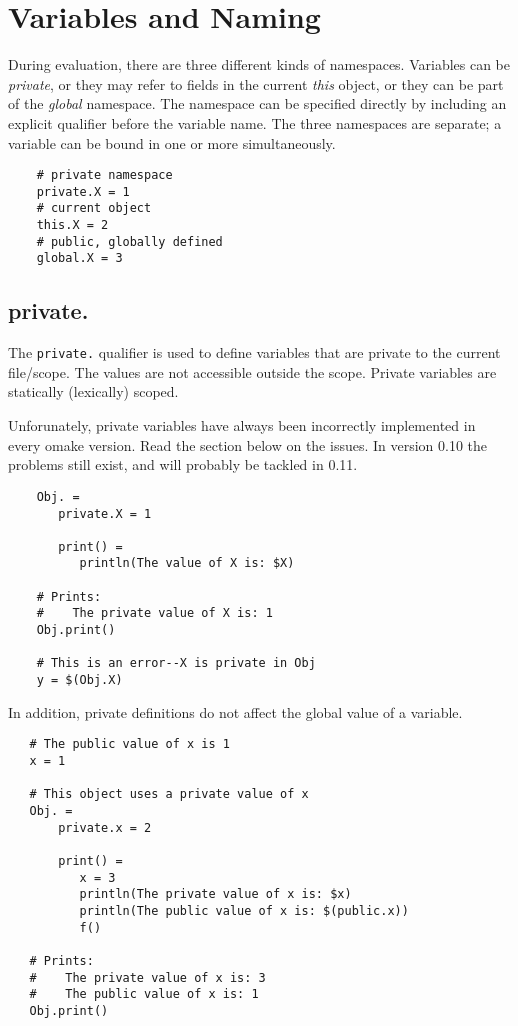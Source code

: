 %
\chapter{Variables and Naming}
\label{chapter:naming}

During evaluation, there are three different kinds of namespaces.  Variables can be \emph{private},
or they may refer to fields in the current \emph{this} object, or they can be part of the
\emph{global} namespace.  The namespace can be specified directly by including an explicit qualifier
before the variable name.  The three namespaces are separate; a variable can be bound in one or more
simultaneously.

\begin{verbatim}
    # private namespace
    private.X = 1
    # current object
    this.X = 2
    # public, globally defined
    global.X = 3
\end{verbatim}

\section{private.}
\label{section:private}

The \verb+private.+ qualifier is used to define variables that are private to the current file/scope.
The values are not accessible outside the scope.  Private variables are statically (lexically) scoped.

\begin{bf}
Unforunately, private variables have always been incorrectly implemented
in every omake version. Read the section below on the issues. In version
0.10 the problems still exist, and will probably be tackled in 0.11.
\end{bf}

\begin{verbatim}
    Obj. =
       private.X = 1

       print() =
          println(The value of X is: $X)

    # Prints:
    #    The private value of X is: 1
    Obj.print()

    # This is an error--X is private in Obj
    y = $(Obj.X)
\end{verbatim}

In addition, private definitions do not affect the global value of a variable.

\begin{verbatim}
   # The public value of x is 1
   x = 1

   # This object uses a private value of x
   Obj. =
       private.x = 2

       print() =
          x = 3
          println(The private value of x is: $x)
          println(The public value of x is: $(public.x))
          f()

   # Prints:
   #    The private value of x is: 3
   #    The public value of x is: 1
   Obj.print()
\end{verbatim}

